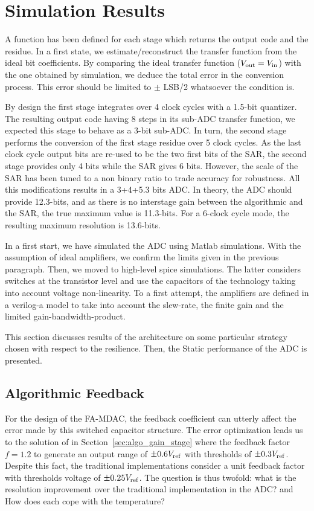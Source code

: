 \section{Simulation Results}             %
A function has been defined for each stage which returns the output code and the residue. In a first state, we estimate/reconstruct the transfer function from the ideal bit coefficients. By comparing the ideal transfer function ($V_{\rm out} = V_{\rm in}$) with the one obtained by simulation, we deduce the total error in the conversion process. This error should be limited to $\pm$ LSB/2 whatsoever the condition is.

By design the first stage integrates over 4 clock cycles with a 1.5-bit quantizer. The resulting output code having 8 steps in its sub-ADC transfer function, we expected this stage to behave as a 3-bit sub-ADC\@. In turn, the second stage performs the conversion of the first stage residue over 5 clock cycles. As the last clock cycle output bits are re-used to be the two first bits of the SAR, the second stage provides only 4 bits while the SAR gives 6 bits. However, the scale of the SAR has been tuned to a non binary ratio to trade accuracy for robustness. All this modifications results in a 3+4+5.3 bits ADC\@. In theory, the ADC should provide 12.3-bits, and as there is no interstage gain between the algorithmic and the SAR, the true maximum value is 11.3-bits. For a 6-clock cycle mode, the resulting maximum resolution is 13.6-bits.

In a first start, we have simulated the ADC using Matlab simulations. With the assumption of ideal amplifiers, we confirm the limits given in the previous paragraph. Then, we moved to high-level spice simulations. The latter considers switches at the transistor level and use the capacitors of the technology taking into account voltage non-linearity. To a first attempt, the amplifiers are defined in a verilog-a model to take into account the slew-rate, the finite gain and the limited gain-bandwidth-product.

This section discusses results of the architecture on some particular strategy chosen with respect to the resilience. Then, the Static performance of the ADC is presented.

\subsection{Algorithmic Feedback}
For the design of the FA-MDAC, the feedback coefficient can utterly affect the error made by this switched capacitor structure. The error optimization leads us to the solution of in Section~\ref{sec:algo_gain_stage} where the feedback factor \(f = 1.2\) to generate an output range of \(\pm 0.6 V_{\rm ref}\) with thresholds of \(\pm 0.3 V_{\rm ref}\). Despite this fact, the traditional implementations consider a unit feedback factor with thresholds voltage of \(\pm 0.25 V_{\rm ref}\). The question is thus twofold: what is the resolution improvement over the traditional implementation in the ADC\@? and How does each cope with the temperature?

